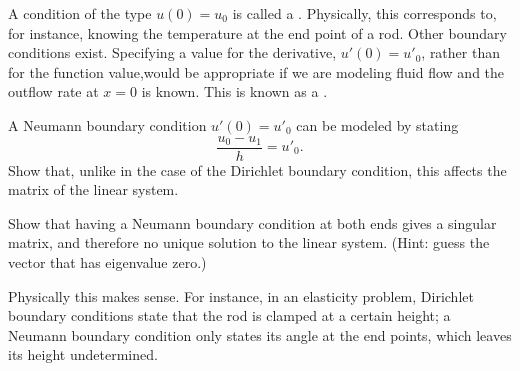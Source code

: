 \begin{exercise}
  A condition of the type $u(0)=u_0$ is called a . Physically, this corresponds to, for
  instance, knowing the temperature at the end point of a rod. Other
  boundary conditions exist. Specifying a value for the derivative,
  $u'(0)=u'_0$, rather than for the function value,would be
  appropriate if we are modeling fluid flow and the outflow rate at
  $x=0$ is known.
  This is known as a
  .

  A Neumann boundary condition $u'(0)=u'_0$ can be modeled by stating
  \begin{equation}
    \frac{u_0-u_1}h=u'_0.
  \end{equation}
  Show that, unlike in the case of the Dirichlet boundary condition,
  this affects the matrix of the linear system. 

  Show that having a
  Neumann boundary condition at both ends gives a singular
  matrix, and therefore no unique solution to the linear system.
  (Hint: guess the vector that has eigenvalue zero.)

  Physically this makes sense. For instance, in an elasticity problem,
  Dirichlet boundary conditions state that the rod is clamped at a
  certain height; a Neumann boundary condition only states its angle
  at the end points, which leaves its height undetermined.
\end{exercise}

